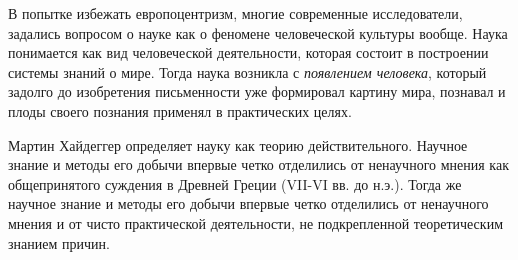 В попытке избежать европоцентризм, многие современные исследователи, задались
вопросом о науке как о феномене человеческой культуры вообще. Наука понимается как вид человеческой деятельности, которая состоит в построении системы знаний о мире. Тогда наука возникла с \textit{появлением человека}, который задолго до изобретения письменности уже
формировал картину мира, познавал и плоды своего познания применял в практических целях.



Мартин Хайдеггер определяет науку как теорию действительного. 
Научное знание и методы его добычи впервые четко отделились от ненаучного
мнения как общепринятого суждения в Древней Греции (VII-VI вв. до н.э.).
Тогда же научное знание и методы его добычи впервые четко отделились от ненаучного
мнения и от чисто практической деятельности, не подкрепленной теоретическим знанием причин.

